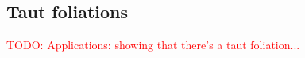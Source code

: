 \documentclass[reqno,11pt]{amsart}
\newcommand*\dif{\mathop{}\!\mathrm{d}}
\newcommand{\weakto}{\rightharpoonup}
\newcommand{\vol}{\mathrm{vol}}
\newcommand{\Mass}{\mathbf M}
\newtheorem{proposition}[theorem]{Proposition}
\theoremstyle{definition}
\numberwithin{equation}{section}
\newcommand\todo[1]{\textcolor{red}{TODO: #1}}
\begin{document}






\subsection{Taut foliations}
\todo{Applications: showing that there's a taut foliation...}
\end{document}
